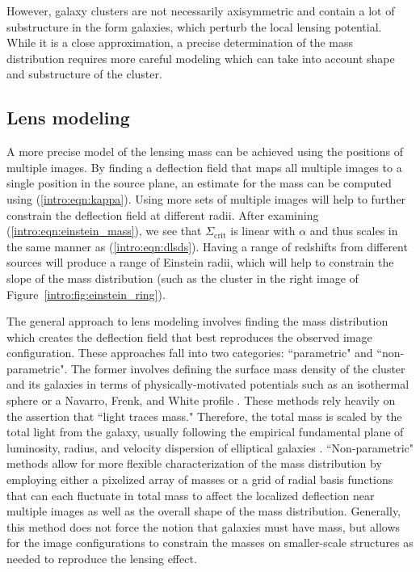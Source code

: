 However, galaxy clusters are not necessarily axisymmetric and contain a lot of substructure in the form galaxies, which perturb the local lensing potential. While it is a close approximation, a precise determination of the mass distribution requires more careful modeling which can take into account shape and substructure of the cluster.

\subsection{Lens modeling}

A more precise model of the lensing mass can be achieved using the positions of multiple images. By finding a deflection field that maps all multiple images to a single position in the source plane, an estimate for the mass can be computed using (\ref{intro:eqn:kappa}). Using more sets of multiple images will help to further constrain the deflection field at different radii. After examining (\ref{intro:eqn:einstein_mass}), we see that $\Sigma_\mathrm{crit}$ is linear with $\alpha$ and thus scales in the same manner as (\ref{intro:eqn:dlsds}). Having a range of redshifts from different sources will produce a range of Einstein radii, which will help to constrain the slope of the mass distribution (such as the cluster in the right image of Figure~\ref{intro:fig:einstein_ring}).

The general approach to lens modeling involves finding the mass distribution which creates the deflection field that best reproduces the observed image configuration. These approaches fall into two categories: ``parametric" and ``non-parametric". The former involves defining the surface mass density of the cluster and its galaxies in terms of physically-motivated potentials such as an isothermal sphere or a Navarro, Frenk, and White profile \citep[NFW; ][]{Navarro:1997qa}. These methods rely heavily on the assertion that ``light traces mass." Therefore, the total mass is scaled by the total light from the galaxy, usually following the empirical fundamental plane of luminosity, radius, and velocity dispersion of elliptical galaxies \citep{Gudehus:1973kq}. ``Non-parametric" methods allow for more flexible characterization of the mass distribution by employing either a pixelized array of masses or a grid of radial basis functions that can each fluctuate in total mass to affect the localized deflection near multiple images as well as the overall shape of the mass distribution. Generally, this method does not force the notion that galaxies must have mass, but allows for the image configurations to constrain the masses on smaller-scale structures as needed to reproduce the lensing effect.

